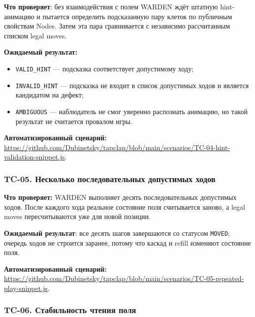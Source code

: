 \documentclass{ZGJournalArticle_2026}
\providecommand{\tightlist}{%
  \setlength{\itemsep}{0pt}\setlength{\parskip}{0pt}}
\begin{document}
\textbf{Что проверяет}: без взаимодействия с полем WARDEN ждёт штатную
hint-анимацию и пытается определить подсказанную пару клеток по
публичным свойствам Nodes. Затем эта пара сравнивается с независимо
рассчитанным списком legal moves.

\textbf{Ожидаемый результат:}

\begin{itemize}
\tightlist
\item
  \texttt{VALID\_HINT} --- подсказка соответствует допустимому ходу;
\item
  \texttt{INVALID\_HINT} --- подсказка не входит в список допустимых
  ходов и является кандидатом на дефект;
\item
  \texttt{AMBIGUOUS} --- наблюдатель не смог уверенно распознать
  анимацию, но такой результат не считается провалом игры.
\end{itemize}

\textbf{Автоматизированный сценарий:}
\href{../scenarios/TC-04-hint-validation-snippet.js}{https://github.com/Dubinetsky/tapclap/blob/main/scenarios/TC-04-hint-validation-snippet.js}.

\subsubsection{TC-05. Несколько последовательных допустимых
ходов}\label{tc-05.-ux43dux435ux441ux43aux43eux43bux44cux43aux43e-ux43fux43eux441ux43bux435ux434ux43eux432ux430ux442ux435ux43bux44cux43dux44bux445-ux434ux43eux43fux443ux441ux442ux438ux43cux44bux445-ux445ux43eux434ux43eux432}

\textbf{Что проверяет:} WARDEN выполняет десять последовательных
допустимых ходов. После каждого хода реальное состояние поля считывается
заново, а legal moves пересчитываются уже для новой позиции.

\textbf{Ожидаемый результат}: все десять шагов завершаются со статусом
\texttt{MOVED}; очередь ходов не строится заранее, потому что каскад и
refill изменяют состояние поля.

\textbf{Автоматизированный сценарий:}
\href{../scenarios/TC-05-repeated-play-snippet.js}{https://github.com/Dubinetsky/tapclap/blob/main/scenarios/TC-05-repeated-play-snippet.js}.

\subsubsection{TC-06. Стабильность чтения
поля}\label{tc-06.-ux441ux442ux430ux431ux438ux43bux44cux43dux43eux441ux442ux44c-ux447ux442ux435ux43dux438ux44f-ux43fux43eux43bux44f}
\end{document}

